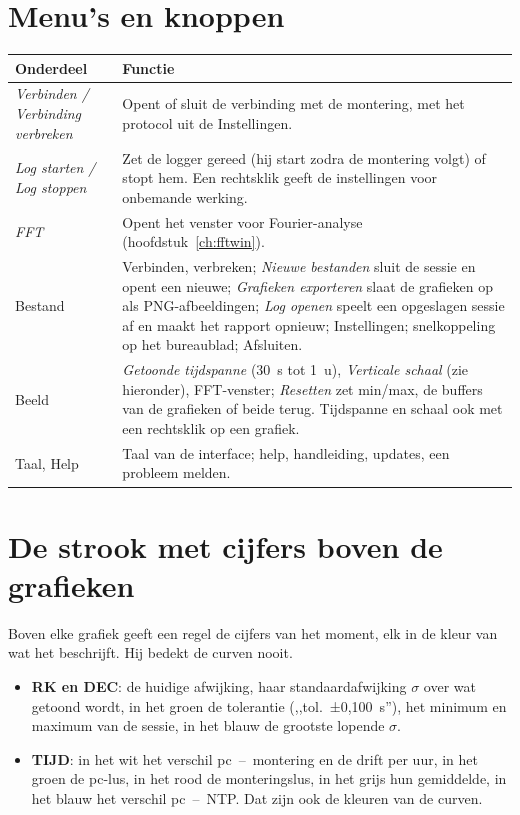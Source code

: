 \section{Menu's en knoppen}
\label{sec:menus}

\begin{center}
\begin{tabularx}{\textwidth}{lX}
\toprule
\textbf{Onderdeel} & \textbf{Functie} \\
\midrule
\emph{Verbinden / Verbinding verbreken} & Opent of sluit de verbinding met de
montering, met het protocol uit de Instellingen. \\
\emph{Log starten / Log stoppen} & Zet de logger gereed (hij start zodra de
montering volgt) of stopt hem. Een rechtsklik geeft de instellingen voor
onbemande werking. \\
\emph{FFT} & Opent het venster voor Fourier-analyse
(hoofdstuk~\ref{ch:fftwin}). \\
Bestand & Verbinden, verbreken; \emph{Nieuwe bestanden} sluit de sessie en
opent een nieuwe; \emph{Grafieken exporteren} slaat de grafieken op als
PNG-afbeeldingen; \emph{Log openen} speelt een opgeslagen sessie af en maakt
het rapport opnieuw; Instellingen; snelkoppeling op het bureaublad;
Afsluiten. \\
Beeld & \emph{Getoonde tijdspanne} (30~s tot 1~u), \emph{Verticale schaal}
(zie hieronder), FFT-venster; \emph{Resetten} zet min/max, de buffers van de
grafieken of beide terug. Tijdspanne en schaal ook met een rechtsklik op een
grafiek. \\
Taal, Help & Taal van de interface; help, handleiding, updates, een probleem
melden. \\
\bottomrule
\end{tabularx}
\end{center}

\section{De strook met cijfers boven de grafieken}
\label{sec:strip}

Boven elke grafiek geeft een regel de cijfers van het moment, elk in de kleur
van wat het beschrijft. Hij bedekt de curven nooit.

\begin{itemize}
  \item \textbf{RK en DEC}: de huidige afwijking, haar standaardafwijking
  $\sigma$ over wat getoond wordt, in het groen de tolerantie (,,tol.~±0,100~s''),
  het minimum en maximum van de sessie, in het blauw de grootste lopende
  $\sigma$.
  \item \textbf{TIJD}: in het wit het verschil pc~--~montering en de drift
  per uur, in het groen de pc-lus, in het rood de monteringslus, in het grijs hun
  gemiddelde, in het blauw het verschil pc~--~NTP. Dat zijn ook de kleuren van
  de curven.
\end{itemize}

